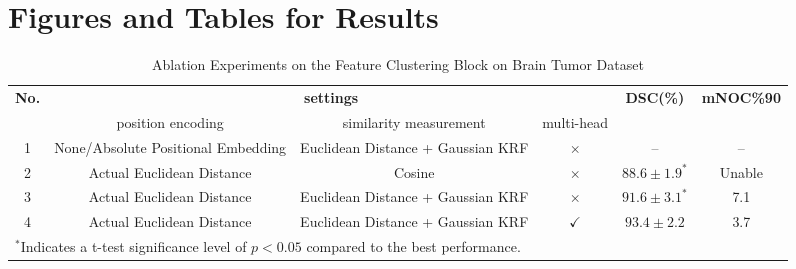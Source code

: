 \documentclass[journal,twoside,web]{ieeecolor}
\begin{document}
\section*{Figures and Tables for Results}
\begin{table*}[!t]
\caption{Ablation Experiments on the Feature Clustering Block on Brain Tumor Dataset}
\label{table3}
\centering
\setlength{\tabcolsep}{12pt}
\renewcommand{\arraystretch}{1.8}
\begin{tabular}{c c c c c c}
\hline
\multirow{2}{*}{\textbf{No.}} &
\multicolumn{3}{c}{\textbf{settings}} &
\multirow{2}{*}{\textbf{DSC(\%)}} &
\multirow{2}{*}{\textbf{mNOC\%90}} \\
\cline{2-4}
 & position encoding & similarity measurement & multi-head & & \\
\hline
1 & None/Absolute Positional Embedding & Euclidean Distance + Gaussian KRF      & $\times$     & --                 & -- \\
2 & Actual Euclidean Distance          & Cosine                                 & $\times$     & $88.6\pm1.9^{*}$   & Unable \\
3 & Actual Euclidean Distance          & Euclidean Distance + Gaussian KRF      & $\times$     & $91.6\pm3.1^{*}$   & 7.1 \\
4 & Actual Euclidean Distance          & Euclidean Distance + Gaussian KRF      & $\checkmark$ & $93.4\pm2.2$       & 3.7 \\
\hline
\multicolumn{6}{l}{\footnotesize ${}^{*}$Indicates a t-test significance level of $p{<}0.05$ compared to the best performance.}
\end{tabular}
\end{table*}
\end{document}

